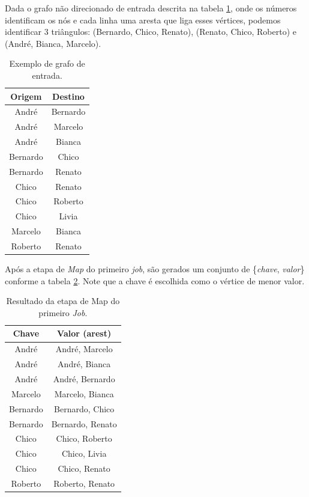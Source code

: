 Dada o grafo não direcionado de entrada descrita na tabela \ref{grafoExemplo}, onde os números identificam 
os nós e cada linha uma aresta que liga esses vértices, podemos identificar 3 triângulos: 
(Bernardo, Chico, Renato), (Renato, Chico, Roberto) e (André, Bianca, Marcelo).

\begin{table}[]
\centering
\caption{Exemplo de grafo de entrada.}
\label{grafoExemplo}
\begin{tabular}{cc}
\hline
{\bf Origem} & {\bf Destino} \\ \hline
André        & Bernardo      \\ \hline
André        & Marcelo       \\ \hline
André        & Bianca        \\ \hline
Bernardo     & Chico         \\ \hline
Bernardo     & Renato        \\ \hline
Chico        & Renato        \\ \hline
Chico        & Roberto       \\ \hline
Chico        & Livia         \\ \hline
Marcelo      & Bianca        \\ \hline
Roberto      & Renato        \\ \hline      
\end{tabular}
\end{table}

Após a etapa de \textit{Map} do primeiro \textit{job}, são gerados um conjunto de 
\{\textit{chave}, \textit{valor}\} conforme a tabela \ref{map1}. Note que a chave é escolhida como 
o vértice de menor valor.

\begin{table}[]
\centering
\caption{Resultado da etapa de Map do primeiro \textit{Job}.}
\label{map1}
\begin{tabular}{cc}

\hline
{\bf Chave} & {\bf Valor (arest)}      \\ \hline
André       & André, Marcelo   \\ \hline
André       & André, Bianca    \\ \hline
André       & André, Bernardo  \\ \hline
Marcelo     & Marcelo, Bianca  \\ \hline
Bernardo    & Bernardo, Chico  \\ \hline
Bernardo    & Bernardo, Renato \\ \hline
Chico       & Chico, Roberto   \\ \hline
Chico       & Chico, Livia     \\ \hline
Chico       & Chico, Renato    \\ \hline
Roberto     & Roberto, Renato  \\ \hline     
\end{tabular}
\end{table}

